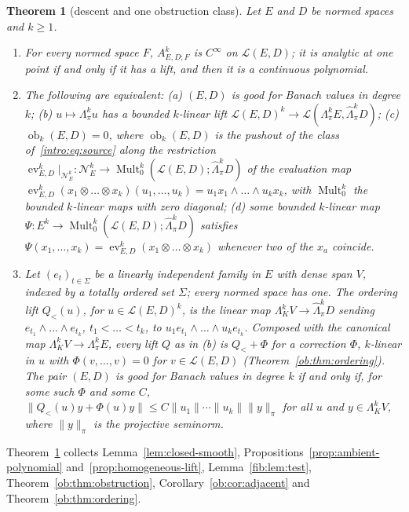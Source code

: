 \documentclass[11pt]{amsart}
\theoremstyle{definition}
\theoremstyle{remark}
\numberwithin{equation}{section}
\newcommand{\cL}{\mathcal L}
\newcommand{\Mult}{\operatorname{Mult}}
\newcommand{\norm}[1]{\lVert #1\rVert}
\theoremstyle{plain}
\newtheorem{introtheorem}{Theorem}
\theoremstyle{definition}
\theoremstyle{plain}
\newcommand{\ev}{\operatorname{ev}}
\newcommand{\ob}{\operatorname{ob}}
\newcommand{\cN}{\mathcal N}
\begin{document}
\begin{introtheorem}[descent and one obstruction class]\label{intro:thm:A}
Let $E$ and $D$ be normed spaces and $k\ge1$.
\begin{enumerate}
\item For every normed space $F$, $A^k_{E,D;F}$ is $C^\infty$ on $\cL(E,D)$; it is analytic at one point if and only if
it has a lift, and then it is a continuous polynomial.
\item The following are equivalent: \textup{(a)} $(E,D)$ is good for Banach values in degree $k$; \textup{(b)}
$u\mapsto\Lambda^k_\pi u$ has a bounded $k$-linear lift $\cL(E,D)^k\to\cL(\Lambda^k_\pi E,\widehat\Lambda^k_\pi D)$;
\textup{(c)} $\ob_k(E,D)=0$, where $\ob_k(E,D)$ is the pushout of the class of~\eqref{intro:eq:source} along the
restriction $\ev^k_{E,D}|_{\cN^k_E}\colon\cN^k_E\to\Mult^k_0(\cL(E,D);\widehat\Lambda^k_\pi D)$ of the evaluation map
$\ev^k_{E,D}(x_1\otimes\dots\otimes x_k)(u_1,\dots,u_k)=u_1x_1\wedge\dots\wedge u_kx_k$, with $\Mult^k_0$ the bounded
$k$-linear maps with zero diagonal; \textup{(d)} some bounded $k$-linear map
$\Psi\colon E^k\to\Mult^k_0(\cL(E,D);\widehat\Lambda^k_\pi D)$ satisfies
$\Psi(x_1,\dots,x_k)=\ev^k_{E,D}(x_1\otimes\dots\otimes x_k)$ whenever two of the $x_a$ coincide.
\item Let $(e_t)_{t\in\Sigma}$ be a linearly independent family in $E$ with dense span $V$, indexed by a totally ordered
set $\Sigma$; every normed space has one. The \emph{ordering lift} $Q_<(u)$, for $u\in\cL(E,D)^k$, is the linear map
$\Lambda^k_KV\to\widehat\Lambda^k_\pi D$ sending $e_{t_1}\wedge\dots\wedge e_{t_k}$, $t_1<\dots<t_k$, to
$u_1e_{t_1}\wedge\dots\wedge u_ke_{t_k}$. Composed with the canonical map $\Lambda^k_KV\to\Lambda^k_\pi E$, every lift
$Q$ as in \textup{(b)} is $Q_<+\Phi$ for a correction $\Phi$, $k$-linear in $u$ with $\Phi(v,\dots,v)=0$ for
$v\in\cL(E,D)$ (Theorem~\ref{ob:thm:ordering}). The pair $(E,D)$ is good for Banach values in degree $k$ if and only
if, for some such $\Phi$ and some $C$, $\norm{Q_<(u)y+\Phi(u)y}\le C\norm{u_1}\cdots\norm{u_k}\norm y_\pi$ for all $u$
and $y\in\Lambda^k_KV$, where $\norm y_\pi$ is the projective seminorm.
\end{enumerate}
\end{introtheorem}

Theorem~\ref{intro:thm:A} collects Lemma~\ref{lem:closed-smooth}, Propositions~\ref{prop:ambient-polynomial}
and~\ref{prop:homogeneous-lift}, Lemma~\ref{fib:lem:test}, Theorem~\ref{ob:thm:obstruction},
Corollary~\ref{ob:cor:adjacent} and Theorem~\ref{ob:thm:ordering}.
\end{document}
